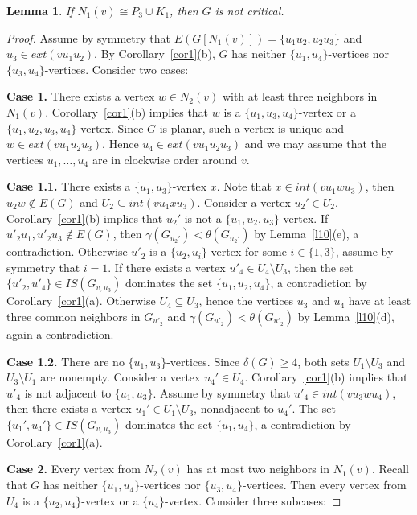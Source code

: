 \documentclass[12pt]{article}
\newtheorem{lemma}{Lemma}
\begin{document}
\begin{lemma}\label{l24}
If  $N_1(v) \cong P_3 \cup K_1$,  then $G$ is not critical.
\end{lemma}

\begin{proof}
Assume by symmetry that $E(G[N_1(v)]) = \{u_1u_2,u_2u_3\}$ and $u_3 \in ext(vu_1u_2)$. By Corollary~\ref{cor1}(b), $G$ has neither $\{u_1,u_4\}$-vertices nor $\{u_3,u_4\}$-vertices. Consider two cases:

\textbf{Case 1.} There exists a vertex $w \in N_2(v)$ with at least three neighbors in $N_1(v)$. Corollary~\ref{cor1}(b) implies that  $w$ is a $\{u_1,u_3,u_4\}$-vertex or a $\{u_1,u_2,u_3,u_4\}$-vertex. Since $G$ is planar, such a vertex is unique and $w \in ext(vu_1u_2u_3)$. Hence $u_4 \in ext(vu_1u_2u_3)$ and we may assume that the vertices $u_1,\ldots,u_4$ are in clockwise order around $v$. 

\textbf{Case 1.1.} There exists a $\{u_1,u_3\}$-vertex $x$. Note that $x \in int(vu_1wu_3)$, then $u_2w \notin E(G)$ and $U_2 \subseteq int(vu_1xu_3)$. Consider a vertex $u_2' \in U_2$. Corollary~\ref{cor1}(b) implies that $u_2'$ is not a $\{u_1,u_2,u_3\}$-vertex. If $u'_2u_1,u'_2u_3 \notin E(G)$, then $\gamma(G_{u_2'}) < \theta(G_{u_2'})$ by Lemma~\ref{l10}(e), a contradiction. Otherwise $u'_2$ is a $\{u_2,u_i\}$-vertex for some $i \in \{1,3\}$, assume by symmetry that $i = 1$. If there exists a vertex $u'_4 \in U_4 \setminus U_3$, then the set $\{u'_2,u'_4\} \in IS(G_{v,u_3})$ dominates the set $\{u_1,u_2,u_4\}$, a contradiction by Corollary~\ref{cor1}(a). Otherwise $U_4 \subseteq U_3$, hence the vertices $u_3$ and $u_4$ have at least three common neighbors in $G_{u'_2}$ and $\gamma(G_{u'_2}) < \theta(G_{u'_2})$ by Lemma~\ref{l10}(d), again a contradiction.

\textbf{Case 1.2.} There are no $\{u_1,u_3\}$-vertices. Since $\delta(G) \geq 4$, both sets $U_1 \setminus U_3$ and $U_3 \setminus U_1$ are nonempty. Consider a vertex $u_4' \in U_4$. Corollary~\ref{cor1}(b) implies that $u'_4$ is not adjacent to $\{u_1,u_3\}$. Assume by symmetry that $u'_4 \in int(vu_3wu_4)$, then there exists a vertex $u_1' \in U_1 \setminus U_3$, nonadjacent to $u_4'$. The set $\{u_1',u_4'\} \in IS(G_{v,u_3})$  dominates the set $\{u_1,u_4\}$, a contradiction by Corollary~\ref{cor1}(a).

\textbf{Case 2.} Every vertex from $N_2(v)$ has at most two neighbors in $N_1(v)$. Recall that $G$ has neither $\{u_1,u_4\}$-vertices nor $\{u_3,u_4\}$-vertices. Then every vertex from $U_4$ is a $\{u_2,u_4\}$-vertex or a $\{u_4\}$-vertex. Consider three subcases:


\end{proof}
\end{document}
